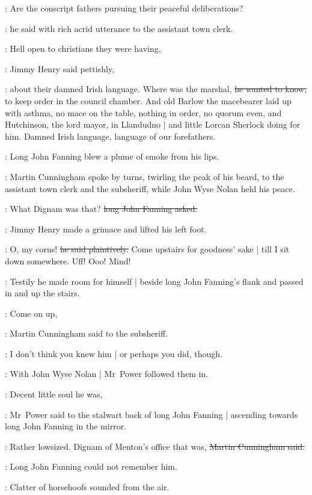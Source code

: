 \longjohn:
Are the conscript fathers pursuing their peaceful deliberations?

:
he said with rich acrid utterance
to the assistant town clerk.

\jimmyhenry:
Hell open to christians they were having,

:
Jimmy Henry said pettishly,

\jimmyhenry:
about their damned Irish language.
Where was the marshal,
\sout{he wanted to know,}
to keep order in the council chamber.
And old Barlow the macebearer
laid up with asthma,
no mace on the table,
nothing in order,
no quorum even,%
and Hutchinson, the lord mayor, in Llandudno |
and little Lorcan Sherlock doing  for him.
Damned Irish language,
language of our forefathers.

:
Long John Fanning blew a plume of smoke from his lips.

:
Martin Cunningham spoke by turns,
twirling the peak of his beard,
to the assistant town clerk and the subsheriff,
while John Wyse Nolan held his peace.

\longjohn:
What Dignam was that?
\sout{long John Fanning asked.}

:
Jimmy Henry made a grimace and lifted his left foot.

\jimmyhenry:
O, my corns!
\sout{he said plaintively.}
Come upstairs for goodness' sake |
till I sit down somewhere.%
Uff!
Ooo!
Mind!

:
Testily he made room for himself |
beside long John Fanning's flank
and passed in and up the stairs.

\cunningham:
Come on up,

:
Martin Cunningham said to the subsheriff.

\cunningham:
I don't think you knew him |
or perhaps you did, though.

:
With John Wyse Nolan |
Mr~Power followed them in.

\power:
Decent little soul he was,

:
Mr~Power said
to the stalwart back of long John Fanning |
ascending towards long John Fanning in the mirror.

\cunningham:
Rather lowsized.
Dignam of Menton's office that was,
\sout{Martin Cunningham said.}

:
Long John Fanning could not remember him.%

:
Clatter of horsehoofs sounded from the air.

